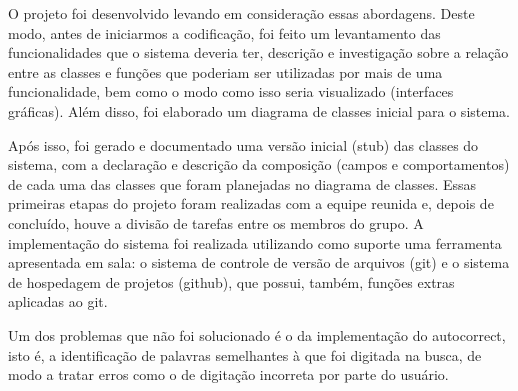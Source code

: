\documentclass[12pt]{article}
\begin{document}
O projeto foi desenvolvido levando em consideração essas abordagens. Deste modo, antes de iniciarmos a codificação, foi feito um levantamento das funcionalidades que o sistema deveria ter, descrição e investigação sobre a relação entre as classes e funções que poderiam ser utilizadas por mais de uma funcionalidade, bem como o modo como isso seria visualizado (interfaces gráficas). Além disso, foi elaborado um diagrama de classes inicial para o sistema. 

Após isso, foi gerado e documentado uma versão inicial (stub) das classes do sistema, com a declaração e descrição da composição (campos e comportamentos) de cada uma das  classes que foram planejadas no diagrama de classes. Essas primeiras etapas do projeto foram realizadas com a equipe reunida e, depois de concluído, houve a divisão de tarefas entre os membros do grupo.
A implementação do sistema foi realizada utilizando como suporte uma ferramenta apresentada em sala: o sistema de controle de versão de arquivos (git) e o sistema de hospedagem de projetos (github), que possui, também, funções extras aplicadas ao git.

Um dos problemas que não foi solucionado é o da implementação do autocorrect, isto é, a identificação de palavras semelhantes à que foi digitada na busca, de modo a tratar erros como o de digitação incorreta por parte do usuário.
\end{document}
